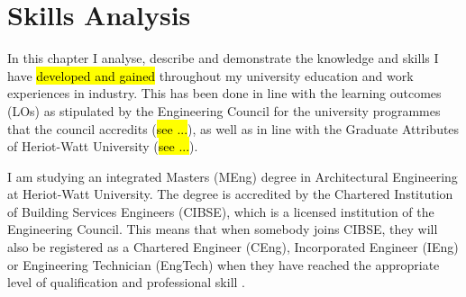 \chapter{Skills Analysis} %

\label{Chapter3} %


In this chapter I analyse, describe and demonstrate the knowledge and skills I have \hl{developed and gained} throughout my university education and work experiences in industry.
This has been done in line with the learning outcomes (LOs) as stipulated by the Engineering Council for the university programmes that the council accredits (\hl{see ...}), as well as in line with the Graduate Attributes of Heriot-Watt University (\hl{see ...}).

I am studying an integrated Masters (MEng) degree in Architectural Engineering at Heriot-Watt University.
The degree is accredited by the Chartered Institution of Building Services Engineers (CIBSE), which is a licensed institution of the Engineering Council.
This means that when somebody joins CIBSE, they will also be registered as a Chartered Engineer (CEng), Incorporated Engineer (IEng) or Engineering Technician (EngTech) when they have reached the appropriate level of qualification and professional skill \citep{whyjoinCIBSE}.

